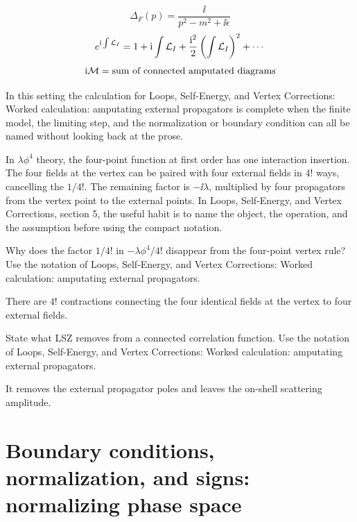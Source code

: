 \[
  \Delta_F(p)=\frac{\ii}{p^2-m^2+\ii\epsilon}
\]
\[
  e^{\mathrm i\int\mathcal L_I}=1+\mathrm i\int\mathcal L_I+\frac{\mathrm i^2}{2}\left(\int\mathcal L_I\right)^2+\cdots
\]
\[
  \mathrm i\mathcal M=\hbox{sum of connected amputated diagrams}
\]

In this setting the calculation for Loops, Self-Energy, and Vertex Corrections: Worked calculation: amputating external propagators is complete when the finite model, the limiting step, and the normalization or boundary condition can all be named without looking back at the prose.




\begin{example}
In \(\lambda\phi^4\) theory, the four-point function at first order has one interaction insertion.  The four fields at the vertex can be paired with four external fields in \(4!\) ways, cancelling the \(1/4!\).  The remaining factor is \(-\ii\lambda\), multiplied by four propagators from the vertex point to the external points.  In Loops, Self-Energy, and Vertex Corrections, section 5, the useful habit is to name the object, the operation, and the assumption before using the compact notation.
\end{example}



\begin{exercise}
Why does the factor \(1/4!\) in \(-\lambda\phi^4/4!\) disappear from the four-point vertex rule?  Use the notation of Loops, Self-Energy, and Vertex Corrections: Worked calculation: amputating external propagators.
\begin{answer}
There are \(4!\) contractions connecting the four identical fields at the vertex to four external fields.
\end{answer}
\end{exercise}

\begin{exercise}
State what LSZ removes from a connected correlation function.  Use the notation of Loops, Self-Energy, and Vertex Corrections: Worked calculation: amputating external propagators.
\begin{answer}
It removes the external propagator poles and leaves the on-shell scattering amplitude.
\end{answer}
\end{exercise}



\section{Boundary conditions, normalization, and signs: normalizing phase space}

